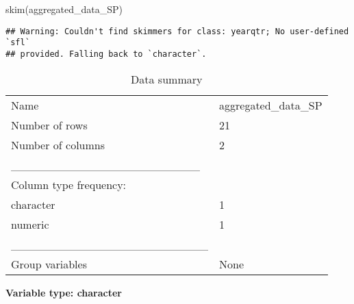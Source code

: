 \documentclass[
]{article}
\newenvironment{Shaded}{\begin{snugshade}}{\end{snugshade}}
\newcommand{\FunctionTok}[1]{\textcolor[rgb]{0.00,0.00,0.00}{#1}}
\newcommand{\NormalTok}[1]{#1}
\begin{document}
\begin{Shaded}
\begin{Highlighting}[]
\FunctionTok{skim}\NormalTok{(aggregated\_data\_SP)}
\end{Highlighting}
\end{Shaded}

\begin{verbatim}
## Warning: Couldn't find skimmers for class: yearqtr; No user-defined `sfl`
## provided. Falling back to `character`.
\end{verbatim}

\begin{longtable}[]{@{}ll@{}}
\caption{Data summary}\tabularnewline
\toprule()
\endhead
Name & aggregated\_data\_SP \\
Number of rows & 21 \\
Number of columns & 2 \\
\_\_\_\_\_\_\_\_\_\_\_\_\_\_\_\_\_\_\_\_\_\_\_ & \\
Column type frequency: & \\
character & 1 \\
numeric & 1 \\
\_\_\_\_\_\_\_\_\_\_\_\_\_\_\_\_\_\_\_\_\_\_\_\_ & \\
Group variables & None \\
\bottomrule()
\end{longtable}

\textbf{Variable type: character}
\end{document}
